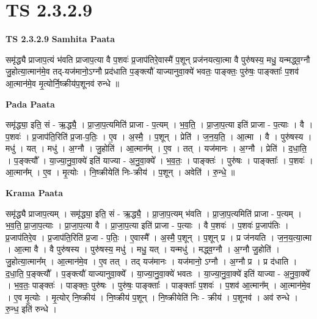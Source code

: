 \documentclass[17pt]{extarticle}
\begin{document}
\section*{ TS 2.3.2.9 }

\textbf{TS 2.3.2.9 } \newline
\textbf{Samhita Paata} \newline

समृ॑द्ध्यै प्राजाप॒त्यं भ॑वति प्राजाप॒त्या वै प॒शवः॑ प्र॒जाप॑तिरे॒वास्मै॑ प॒शून् प्रज॑नयत्या॒त्मा वै पुरु॑षस्य॒ मधु॒ यन्मद्ध्व॒ग्नौ जु॒होत्या॒त्मान॑मे॒व तद्-यज॑मानो॒ऽग्नौ प्रद॑धाति प॒ङ्क्त्यौ॑ याज्यानुवा॒क्ये॑ भवतः॒ पाङ्क्तः॒ पुरु॑षः॒ पाङ्क्ताः᳚ प॒शव॑ आ॒त्मान॑मे॒व मृ॒त्योर्नि॒ष्क्रीय॑प॒शूनव॑ रुन्धे ॥ \newline

\textbf{Pada Paata} \newline

समृ॑द्ध्या॒ इति॒ सं - ऋ॒द्ध्यै॒ । प्रा॒जा॒प॒त्यमिति॑ प्राजा - प॒त्यम् । भ॒व॒ति॒ । प्रा॒जा॒प॒त्या इति॑ प्राजा - प॒त्याः । वै । प॒शवः॑ । प्र॒जाप॑ति॒रिति॑ प्र॒जा-प॒तिः॒ । ए॒व । अ॒स्मै॒ । प॒शून् । प्रेति॑ । ज॒न॒य॒ति॒ । आ॒त्मा । वै । पुरु॑षस्य । मधु॑ । यत् । मधु॑ । अ॒ग्नौ । जु॒होति॑ । आ॒त्मान᳚म् । ए॒व । तत् । यज॑मानः । अ॒ग्नौ । प्रेति॑ । द॒धा॒ति॒ । प॒ङ्क्त्यौ᳚ । या॒ज्या॒नु॒वा॒क्ये॑ इति॑ याज्या - अ॒नु॒वा॒क्ये᳚ । भ॒व॒तः॒ । पाङ्क्तः॑ । पुरु॑षः । पाङ्क्ताः᳚ । प॒शवः॑ । आ॒त्मान᳚म् । ए॒व । मृ॒त्योः । नि॒ष्क्रीयेति॑ निः-क्रीय॑ । प॒शून् । अवेति॑ । रु॒न्धे॒ ॥  \newline


\textbf{Krama Paata} \newline

समृ॑द्ध्यै प्राजाप॒त्यम् । समृ॑द्ध्या॒ इति॒ सं - ऋ॒द्ध्यै॒ । प्रा॒जा॒प॒त्यम् भ॑वति । प्रा॒जा॒प॒त्यमिति॑ प्राजा - प॒त्यम् । भ॒व॒ति॒ प्रा॒जा॒प॒त्याः । प्रा॒जा॒प॒त्या वै । प्रा॒जा॒प॒त्या इति॑ प्राजा - प॒त्याः । वै प॒शवः॑ । प॒शवः॑ प्र॒जाप॑तिः । प्र॒जाप॑तिरे॒व । प्र॒जाप॑ति॒रिति॑ प्र॒जा - प॒तिः॒ । ए॒वास्मै᳚ । अ॒स्मै॒ प॒शून् । प॒शून् प्र । प्र ज॑नयति । ज॒न॒य॒त्या॒त्मा । आ॒त्मा वै । वै पुरु॑षस्य । पुरु॑षस्य॒ मधु॑ । मधु॒ यत् । यन्मधु॑ । मद्ध्व॒ग्नौ । अ॒ग्नौ जु॒होति॑ । जु॒होत्या॒त्मान᳚म् । आ॒त्मान॑मे॒व । ए॒व तत् । तद् यज॑मानः । यज॑मानो॒ ऽग्नौ । अ॒ग्नौ प्र । प्र द॑धाति । द॒धा॒ति॒ प॒ङ्क्त्यौ᳚ । प॒ङ्क्त्यौ॑ याज्यानुवा॒क्ये᳚ । या॒ज्या॒नु॒वा॒क्ये॑ भवतः । या॒ज्या॒नु॒वा॒क्ये॑ इति॑ याज्या - अ॒नु॒वा॒क्ये᳚ । भ॒व॒तः॒ पाङ्क्तः॑ । पाङ्क्तः॒ पुरु॑षः । पुरु॑षः॒ पाङ्क्ताः᳚ । पाङ्क्ताः᳚ प॒शवः॑ । प॒शव॑ आ॒त्मान᳚म् । आ॒त्मान॑मे॒व । ए॒व मृ॒त्योः । मृ॒त्योर् नि॒ष्क्रीय॑ । नि॒ष्क्रीय॑ प॒शून् । नि॒ष्क्रीयेति॑ निः - क्रीय॑ । प॒शूनव॑ । अव॑ रुन्धे । रु॒न्ध॒ इति॑ रुन्धे । \newline
\end{document}
